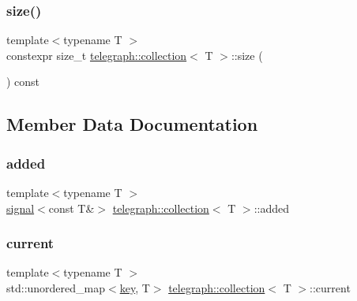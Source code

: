 \mbox{\label{classtelegraph_1_1collection_ae51a6f64a8c24e2c602e6c3c4865249a}} 
\subsubsection{\texorpdfstring{size()}{size()}}
{\footnotesize\ttfamily template$<$typename T $>$ \\
constexpr size\+\_\+t \hyperlink{classtelegraph_1_1collection}{telegraph\+::collection}$<$ T $>$\+::size (\begin{DoxyParamCaption}{ }\end{DoxyParamCaption}) const\hspace{0.3cm}{\ttfamily [inline]}}



\subsection{Member Data Documentation}
\mbox{\label{classtelegraph_1_1collection_a7ac59f0f85680539f80d085dd35b3c47}} 
\subsubsection{\texorpdfstring{added}{added}}
{\footnotesize\ttfamily template$<$typename T $>$ \\
\hyperlink{classtelegraph_1_1signal}{signal}$<$const T\&$>$ \hyperlink{classtelegraph_1_1collection}{telegraph\+::collection}$<$ T $>$\+::added}

\mbox{\label{classtelegraph_1_1collection_a5a6329136af41edba2e17fddaaa5384c}} 
\subsubsection{\texorpdfstring{current}{current}}
{\footnotesize\ttfamily template$<$typename T $>$ \\
std\+::unordered\+\_\+map$<$\hyperlink{classtelegraph_1_1collection_a7d1c05b1bdcbe95a3127122969e14173}{key}, T$>$ \hyperlink{classtelegraph_1_1collection}{telegraph\+::collection}$<$ T $>$\+::current}

